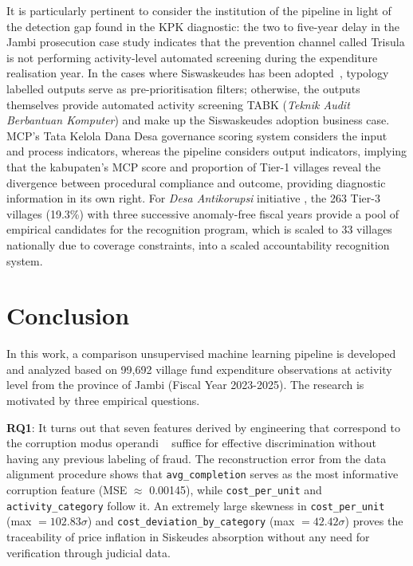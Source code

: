 \documentclass[3p,times,procedia]{elsarticle}
\begin{document}
It is particularly pertinent to consider the institution of the pipeline in light of the detection gap found in the KPK diagnostic: the two to five-year delay in the Jambi prosecution case study indicates that the prevention channel called Trisula \cite{ref4} is not performing activity-level automated screening during the expenditure realisation year. In the cases where Siswaskeudes has been adopted~\cite{ref6}, typology labelled outputs serve as pre-prioritisation filters; otherwise, the outputs themselves provide automated activity screening TABK (\textit{Teknik Audit Berbantuan Komputer}) and make up the Siswaskeudes adoption business case. MCP’s Tata Kelola Dana Desa governance scoring system considers the input and process indicators, whereas the pipeline considers output indicators, implying that the kabupaten’s MCP score and proportion of Tier-1 villages reveal the divergence between procedural compliance and outcome, providing diagnostic information in its own right. For \textit{Desa Antikorupsi} initiative \cite{ref5}, the 263 Tier-3 villages (19.3\%) with three successive anomaly-free fiscal years provide a pool of empirical candidates for the recognition program, which is scaled to 33 villages nationally due to coverage constraints, into a scaled accountability recognition system.

\section{Conclusion}
\label{sec:conclusion}

In this work, a comparison unsupervised machine learning pipeline is developed and analyzed based on 99,692 village fund expenditure observations at activity level from the province of Jambi (Fiscal Year 2023-2025). The research is motivated by three empirical questions.

\textbf{RQ1}: It turns out that seven features derived by engineering that correspond to the corruption modus operandi ~\cite{ref13,ref14} suffice for effective discrimination without having any previous labeling of fraud. The reconstruction error from the data alignment procedure shows that \texttt{avg\_completion} serves as the most informative corruption feature (MSE $\approx$ 0.00145), while \texttt{cost\_per\_unit} and \texttt{activity\_category} follow it. An extremely large skewness in \texttt{cost\_per\_unit} (max $= 102.83\sigma$) and \texttt{cost\_deviation\_by\_category} (max $= 42.42\sigma$) proves the traceability of price inflation in Siskeudes absorption without any need for verification through judicial data.
\end{document}
